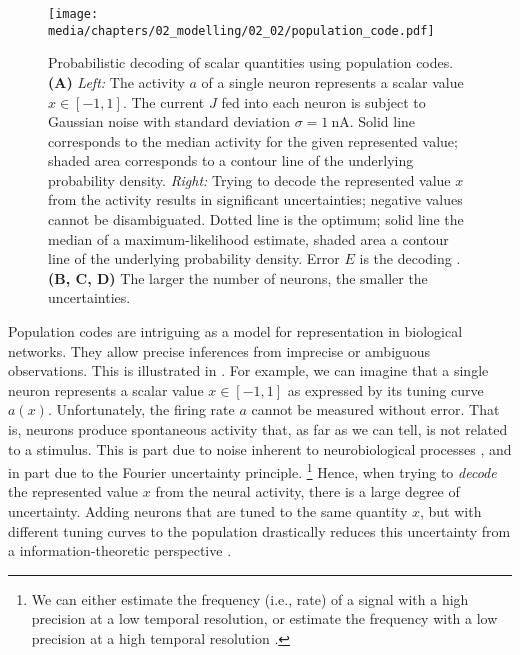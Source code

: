 \begin{figure}
	\centering
	\texttt{[image: media/chapters/02\_modelling/02\_02/population\_code.pdf]}
	\caption[Probabilistic decoding of scalar quantities using population codes]{Probabilistic decoding of scalar quantities using population codes.
	\textbf{(A)} \emph{Left:} The activity $a$ of a single neuron represents a scalar value $x \in [-1, 1]$.
	The current $J$ fed into each neuron is subject to Gaussian noise with standard deviation $\sigma = \SI{1}{\nano\ampere}$.
	Solid line corresponds to the median activity for the given represented value; shaded area corresponds to a contour line of the underlying probability density.
	\emph{Right:} Trying to decode the represented value $x$ from the activity results in significant uncertainties; negative values cannot be disambiguated. Dotted line is the optimum; solid line the median of a maximum-likelihood estimate, shaded area a contour line of the underlying probability density.
	Error $E$ is the decoding \RMSE.
	\textbf{(B, C, D)} The larger the number of neurons, the smaller the uncertainties.}
	\label{fig:population_code}
\end{figure}

Population codes are intriguing as a model for representation in biological networks.
They allow precise inferences from imprecise or ambiguous observations. This is illustrated in .
For example, we can imagine that a single neuron represents a scalar value $x \in [-1, 1]$ as expressed by its tuning curve $a(x)$.
Unfortunately, the firing rate $a$ cannot be measured without error.
That is, neurons produce spontaneous activity that, as far as we can tell, is not related to a stimulus.
This is part due to noise inherent to neurobiological processes \citep[cf.][Section~2.2.1]{eliasmith2003neural}, and in part due to the Fourier uncertainty principle.%
\footnote{We can either estimate the frequency (i.e., rate) of a signal with a high precision at a low temporal resolution, or estimate the frequency with a low precision at a high temporal resolution \citep{gabor1946theory}.}
Hence, when trying to \emph{decode} the represented value $x$ from the neural activity, there is a large degree of uncertainty.
Adding neurons that are tuned to the same quantity $x$, but with different tuning curves to the population drastically reduces this uncertainty from a information-theoretic perspective \citep{ma2009population}.
